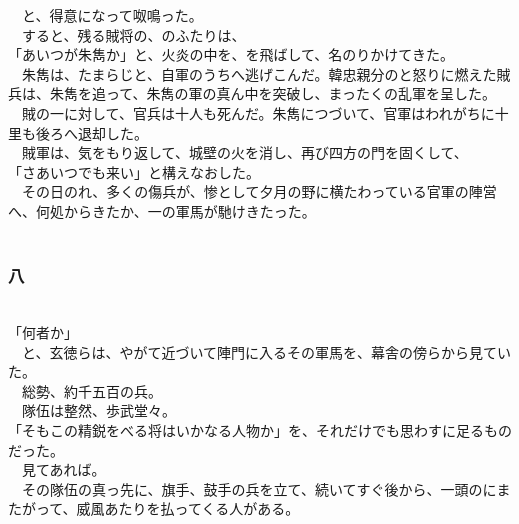 \documentclass[
  paper=a5,
  fontsize=10pt,
  jafontsize=9.5pt,
  tate,                  %
  open_bracket_pos=nibu, %
]{jlreq}
\begin{document}
　と、得意になって呶鳴った。\\


　すると、残る賊将の、のふたりは、\\


「あいつが朱雋か」と、火炎の中を、を飛ばして、名のりかけてきた。\\


　朱雋は、たまらじと、自軍のうちへ逃げこんだ。韓忠親分のと怒りに燃えた賊兵は、朱雋を追って、朱雋の軍の真ん中を突破し、まったくの乱軍を呈した。\\


　賊の一に対して、官兵は十人も死んだ。朱雋につづいて、官軍はわれがちに十里も後ろへ退却した。\\


　賊軍は、気をもり返して、城壁の火を消し、再び四方の門を固くして、\\


「さあいつでも来い」と構えなおした。\\


　その日のれ、多くの傷兵が、惨として夕月の野に横たわっている官軍の陣営へ、何処からきたか、一の軍馬が馳けきたった。\\

\\

\subsubsection{八}

\\


「何者か」\\


　と、玄徳らは、やがて近づいて陣門に入るその軍馬を、幕舎の傍らから見ていた。\\


　総勢、約千五百の兵。\\


　隊伍は整然、歩武堂々。\\


「そもこの精鋭をべる将はいかなる人物か」を、それだけでも思わすに足るものだった。\\


　見てあれば。\\


　その隊伍の真っ先に、旗手、鼓手の兵を立て、続いてすぐ後から、一頭のにまたがって、威風あたりを払ってくる人がある。\\
\end{document}
